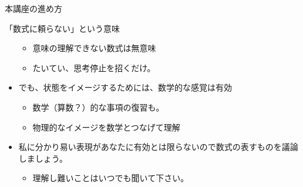 \begin{frame}
\begin{block}{本講座の進め方}
\begin{block}{「数式に頼らない」という意味}
\begin{itemize}
  \begin{itemize}
  \tightlist
  \item
    意味の理解できない数式は無意味
  \item
    たいてい、思考停止を招くだけ。
  \end{itemize}
\item
  でも、状態をイメージするためには、数学的な感覚は有効

  \begin{itemize}
  \tightlist
  \item
    数学（算数？）的な事項の復習も。
  \item
    物理的なイメージを数学とつなげて理解
  \end{itemize}
\item
  私に分かり易い表現があなたに有効とは限らないので数式の表すものを議論しましょう。

  \begin{itemize}
  \tightlist
  \item
    {理解し難いことはいつでも聞いて下さい。}
  \end{itemize}
\end{itemize}

\end{block}

\end{block}

\end{frame}

